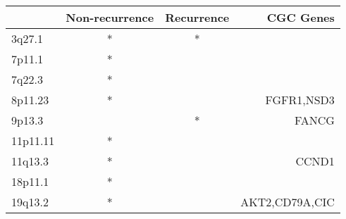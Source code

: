 \begin{tabular}{lccr}
\toprule
{} & Non-recurrence & Recurrence &       CGC Genes \\
\midrule
3q27.1   &              * &          * &                 \\
7p11.1   &              * &            &                 \\
7q22.3   &              * &            &                 \\
8p11.23  &              * &            &      FGFR1,NSD3 \\
9p13.3   &                &          * &           FANCG \\
11p11.11 &              * &            &                 \\
11q13.3  &              * &            &           CCND1 \\
18p11.1  &              * &            &                 \\
19q13.2  &              * &            &  AKT2,CD79A,CIC \\
\bottomrule
\end{tabular}
